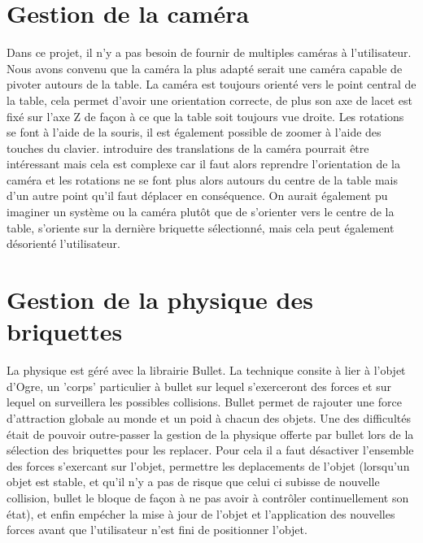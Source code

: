 \documentclass[frenchb,twoside]{EPURapport}
\begin{document}
    \section{Gestion de la caméra}
        Dans ce projet, il n'y a pas besoin de fournir de multiples caméras à
        l'utilisateur. Nous avons convenu que la caméra la plus adapté serait
        une caméra capable de pivoter autours de la table. La caméra est
        toujours orienté vers le point central de la table, cela permet d'avoir
        une orientation correcte, de plus son axe de lacet est fixé sur l'axe
        Z de façon à ce que la table soit toujours vue droite. Les rotations se
        font à l'aide de la souris, il est également possible de zoomer à
        l'aide des touches du clavier. introduire des translations de la caméra
        pourrait être intéressant mais cela est complexe car il faut alors
        reprendre l'orientation de la caméra et les rotations ne se font plus
        alors autours du centre de la table mais d'un autre point qu'il faut
        déplacer en conséquence. On aurait également pu imaginer un système ou
        la caméra plutôt que de s'orienter vers le centre de la table,
        s'oriente sur la dernière briquette sélectionné, mais cela peut
        également désorienté l'utilisateur.

    \section{Gestion de la physique des briquettes}
        La physique est géré avec la librairie Bullet. La technique consite à
        lier à l'objet d'Ogre, un 'corps' particulier à bullet sur lequel
        s'exerceront des forces et sur lequel on surveillera les possibles
        collisions. Bullet permet de rajouter une force d'attraction globale au
        monde et un poid à chacun des objets. Une des difficultés était de
        pouvoir outre-passer la gestion de la physique offerte par bullet lors
        de la sélection des briquettes pour les replacer. Pour cela il a faut
        désactiver l'ensemble des forces s'exercant sur l'objet, permettre les
        deplacements de l'objet (lorsqu'un objet est stable, et qu'il n'y a pas
        de risque que celui ci subisse de nouvelle collision, bullet le bloque
        de façon à ne pas avoir à contrôler continuellement son état), et enfin
        empécher la mise à jour de l'objet et l'application des nouvelles
        forces avant que l'utilisateur n'est fini de positionner l'objet. 
\end{document}
